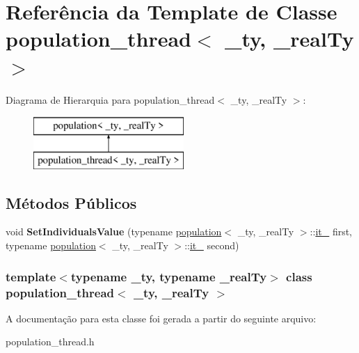 \hypertarget{classpopulation__thread}{
\section{Referência da Template de Classe population\_\-thread$<$ \_\-ty, \_\-realTy $>$}
\label{classpopulation__thread}
}
Diagrama de Hierarquia para population\_\-thread$<$ \_\-ty, \_\-realTy $>$:\begin{figure}[H]
\begin{center}
\leavevmode
\includegraphics[height=2cm]{classpopulation__thread}
\end{center}
\end{figure}
\subsection*{Métodos Públicos}
\begin{DoxyCompactItemize}
\item 
\hypertarget{classpopulation__thread_a9ff695442d2529a10aec61636ae5dc40}{
void {\bfseries SetIndividualsValue} (typename \hyperlink{classpopulation}{population}$<$ \_\-ty, \_\-realTy $>$::\hyperlink{classpopulation_aa2f35e7dcc0553a7d2a96e5dca6105e0}{it\_\-} first, typename \hyperlink{classpopulation}{population}$<$ \_\-ty, \_\-realTy $>$::\hyperlink{classpopulation_aa2f35e7dcc0553a7d2a96e5dca6105e0}{it\_\-} second)}
\label{classpopulation__thread_a9ff695442d2529a10aec61636ae5dc40}

\end{DoxyCompactItemize}
\subsubsection*{template$<$typename \_\-ty, typename \_\-realTy$>$ class population\_\-thread$<$ \_\-ty, \_\-realTy $>$}



A documentação para esta classe foi gerada a partir do seguinte arquivo:\begin{DoxyCompactItemize}
\item 
population\_\-thread.h\end{DoxyCompactItemize}
